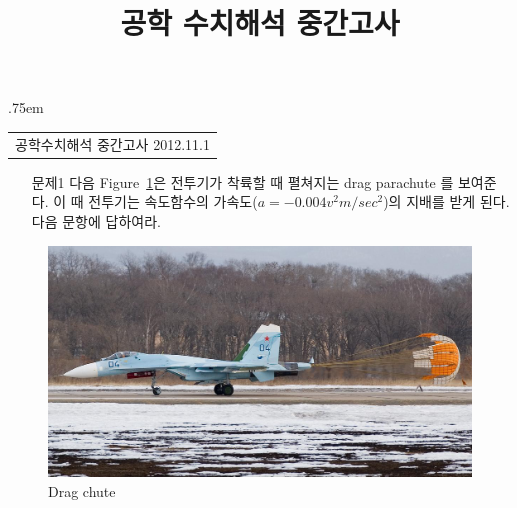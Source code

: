 \documentclass[a4,10pt]{article}
\title{공학 수치해석 중간고사}
\author{}
\makeatletter
\numberwithin{algorithm}{section}
\theoremstyle{examplestyle}
\renewcommand{\tableofcontents}[1][\contentsname]{%
  \section*{#1}
  \begin{multicols}{2}
    \@starttoc{toc}
  \end{multicols}
}
\makeatother
\begin{document}
\begin{center}
{\lineskip .75em\begin{tabular}[t]{c}\LARGE{공학수치해석 중간고사} \large{2012.11.1}\end{tabular}\par}%
\end{center}

\begin{itemize}
\item[문제1] 다음 Figure~\ref{fig:e1}은 전투기가 착륙할 때 펼쳐지는 drag parachute 를 보여준다. 이 때 전투기는 속도함수의 가속도($a=-0.004v^2 m/sec^2$)의 지배를 받게 된다. 다음 문항에 답하여라.
\end{itemize}
\begin{figure}[!hbpt]
\centering
\includegraphics[keepaspectratio=true,width=0.6\linewidth]{midterm/dragchute.eps}
\caption{Drag chute}
\label{fig:e1}
\end{figure}
\end{document}
